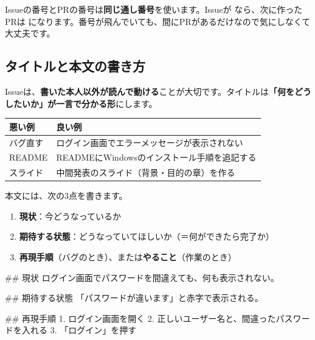 \begin{notebox}
Issueの番号とPRの番号は\textbf{同じ通し番号}を使います。Issueが  なら、次に作ったPRは  になります。番号が飛んでいても、間にPRがあるだけなので気にしなくて大丈夫です。
\end{notebox}

\subsection{タイトルと本文の書き方}

Issueは、\textbf{書いた本人以外が読んで動ける}ことが大切です。タイトルは\textbf{「何をどうしたいか」が一言で分かる形}にします。

\begin{center}
\begin{tabularx}{\linewidth}{@{}X X@{}}
\toprule
悪い例 & 良い例 \\
\midrule
バグ直す & ログイン画面でエラーメッセージが表示されない \\
README & READMEにWindowsのインストール手順を追記する \\
スライド & 中間発表のスライド（背景・目的の章）を作る \\
\bottomrule
\end{tabularx}
\end{center}

\medskip

本文には、次の3点を書きます。

\begin{enumerate}[leftmargin=1.6em]
  \item \textbf{現状}：今どうなっているか
  \item \textbf{期待する状態}：どうなっていてほしいか（＝何ができたら完了か）
  \item \textbf{再現手順}（バグのとき）、または\textbf{やること}（作業のとき）
\end{enumerate}

\begin{codebox}[markdown]
\begin{code}
## 現状
ログイン画面でパスワードを間違えても、何も表示されない。

## 期待する状態
「パスワードが違います」と赤字で表示される。

## 再現手順
1. ログイン画面を開く
2. 正しいユーザー名と、間違ったパスワードを入れる
3. 「ログイン」を押す
\end{code}
\end{codebox}

